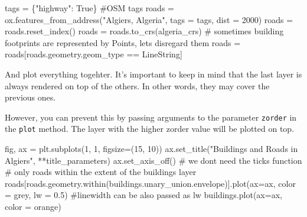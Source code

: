 \documentclass[
  letterpaper,
  DIV=11,
  numbers=noendperiod]{scrreprt}
\newenvironment{Shaded}{\begin{snugshade}}{\end{snugshade}}
\newcommand{\CommentTok}[1]{\textcolor[rgb]{0.37,0.37,0.37}{#1}}
\newcommand{\DecValTok}[1]{\textcolor[rgb]{0.68,0.00,0.00}{#1}}
\newcommand{\FloatTok}[1]{\textcolor[rgb]{0.68,0.00,0.00}{#1}}
\newcommand{\NormalTok}[1]{\textcolor[rgb]{0.00,0.23,0.31}{#1}}
\newcommand{\OperatorTok}[1]{\textcolor[rgb]{0.37,0.37,0.37}{#1}}
\newcommand{\StringTok}[1]{\textcolor[rgb]{0.13,0.47,0.30}{#1}}
\newcommand{\VariableTok}[1]{\textcolor[rgb]{0.07,0.07,0.07}{#1}}
\begin{document}
\begin{Shaded}
\begin{Highlighting}[]
\NormalTok{tags }\OperatorTok{=}\NormalTok{ \{}\StringTok{"highway"}\NormalTok{: }\VariableTok{True}\NormalTok{\} }\CommentTok{\#OSM tags}
\NormalTok{roads }\OperatorTok{=}\NormalTok{ ox.features\_from\_address(}\StringTok{"Algiers, Algeria"}\NormalTok{, tags }\OperatorTok{=}\NormalTok{ tags, dist }\OperatorTok{=} \DecValTok{2000}\NormalTok{) }
\NormalTok{roads }\OperatorTok{=}\NormalTok{ roads.reset\_index()}
\NormalTok{roads }\OperatorTok{=}\NormalTok{ roads.to\_crs(algeria\_crs)}
 \CommentTok{\# sometimes building footprints are represented by Points, let\textquotesingle{}s disregard them}
\NormalTok{roads }\OperatorTok{=}\NormalTok{ roads[roads.geometry.geom\_type }\OperatorTok{==} \StringTok{\textquotesingle{}LineString\textquotesingle{}}\NormalTok{]}
\end{Highlighting}
\end{Shaded}

And plot everything togehter. It's important to keep in mind that the
last layer is always rendered on top of the others. In other words, they
may cover the previous ones.

However, you can prevent this by passing arguments to the parameter
\texttt{zorder} in the \texttt{plot} method. The layer with the higher
zorder value will be plotted on top.

\begin{Shaded}
\begin{Highlighting}[]
\NormalTok{fig, ax }\OperatorTok{=}\NormalTok{ plt.subplots(}\DecValTok{1}\NormalTok{, }\DecValTok{1}\NormalTok{, figsize}\OperatorTok{=}\NormalTok{(}\DecValTok{15}\NormalTok{, }\DecValTok{10}\NormalTok{))}
\NormalTok{ax.set\_title(}\StringTok{"Buildings and Roads in Algiers"}\NormalTok{, }\OperatorTok{**}\NormalTok{title\_parameters)}
\NormalTok{ax.set\_axis\_off() }\CommentTok{\# we don\textquotesingle{}t need the ticks function}
\CommentTok{\# only roads within the extent of the buildings layer}
\NormalTok{roads[roads.geometry.within(buildings.unary\_union.envelope)].plot(ax}\OperatorTok{=}\NormalTok{ax, color }\OperatorTok{=} \StringTok{\textquotesingle{}grey\textquotesingle{}}\NormalTok{, lw }\OperatorTok{=} \FloatTok{0.5}\NormalTok{) }\CommentTok{\#linewidth can be also passed as lw }
\NormalTok{buildings.plot(ax}\OperatorTok{=}\NormalTok{ax, color }\OperatorTok{=} \StringTok{\textquotesingle{}orange\textquotesingle{}}\NormalTok{)}
\end{Highlighting}
\end{Shaded}
\end{document}
